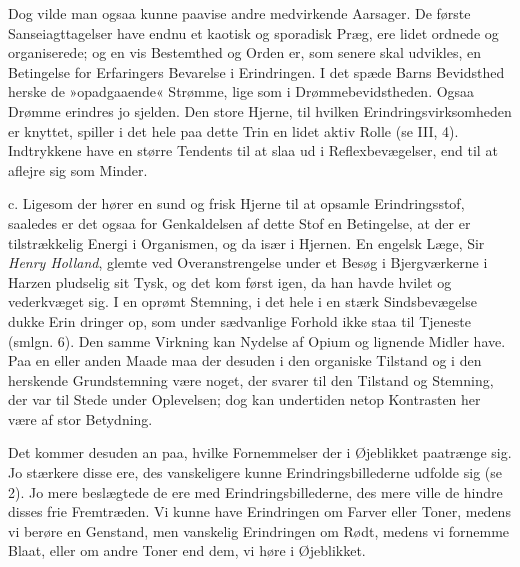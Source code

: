 \documentclass[12pt,a4paper,openany]{book}
\newcommand{\opage}[1]{\marginnote{\footnotesize\textit{[#1]}}}
\begin{document}
Dog vilde man ogsaa kunne paavise andre medvirkende Aarsager. De første
Sanseiagttagelser have endnu et kaotisk og sporadisk Præg, ere lidet
ordnede og organiserede; og en vis Bestemthed og Orden er, som senere
skal udvikles, en Betingelse for Erfaringers Bevarelse i Erindringen. I
det spæde Barns Bevidsthed herske de »opadgaaende« Strømme, lige som i
Drømmebevidstheden. Ogsaa Drømme erindres jo sjelden. Den store Hjerne,
til hvilken Erindringsvirksomheden er knyttet, spiller i det hele paa
dette Trin en lidet aktiv Rolle (se III, 4). Indtrykkene have en større
Tendents til at slaa ud i Reflexbevægelser, end til at aflejre sig som
Minder.

c. Ligesom der hører en sund og frisk Hjerne til at opsamle
Erindringsstof, saaledes er det ogsaa for Genkaldelsen af dette Stof en
Betingelse, at der er tilstrækkelig Energi i Organismen, og da især i
Hjernen. En engelsk Læge, Sir \emph{Henry Holland}, glemte ved
Overanstrengelse under et Besøg i Bjergværkerne i Harzen pludselig sit
Tysk, og det kom først igen, da han havde hvilet og vederkvæget sig. I
en oprømt Stemning, i det hele i en stærk Sindsbevægelse dukke Erin%
\opage{183}dringer op, som under sædvanlige Forhold ikke staa til
Tjeneste (smlgn. 6). Den samme Virkning kan Nydelse af Opium og lignende
Midler have. Paa en eller anden Maade maa der desuden i den organiske
Tilstand og i den herskende Grundstemning være noget, der svarer til den
Tilstand og Stemning, der var til Stede under Oplevelsen; dog kan
undertiden netop Kontrasten her være af stor Betydning.

Det kommer desuden an paa, hvilke Fornemmelser der i Øjeblikket
paatrænge sig. Jo stærkere disse ere, des vanskeligere kunne
Erindringsbillederne udfolde sig (se 2). Jo mere beslægtede de ere med
Erindringsbillederne, des mere ville de hindre disses frie Fremtræden.
Vi kunne have Erindringen om Farver eller Toner, medens vi berøre en
Genstand, men vanskelig Erindringen om Rødt, medens vi fornemme Blaat,
eller om andre Toner end dem, vi høre i Øjeblikket.
\end{document}
